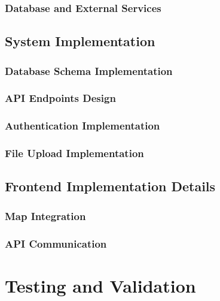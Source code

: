 \documentclass[12pt,a4paper]{report}
\begin{document}
\subsection{Database and External Services}

\section{System Implementation}
\subsection{Database Schema Implementation}

\subsection{API Endpoints Design}

\subsection{Authentication Implementation}

\subsection{File Upload Implementation}

\section{Frontend Implementation Details}
\subsection{Map Integration}

\subsection{API Communication}

\chapter{Testing and Validation}
\end{document}
